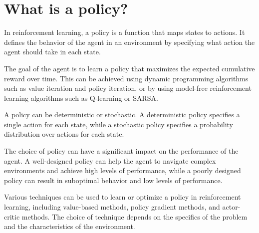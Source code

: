 \section{What is a policy?}
In reinforcement learning, a policy is a function that maps states to actions. It defines the behavior of the agent in an environment by specifying what action the agent should take in each state.

The goal of the agent is to learn a policy that maximizes the expected cumulative reward over time. This can be achieved using dynamic programming algorithms such as value iteration and policy iteration, or by using model-free reinforcement learning algorithms such as Q-learning or SARSA.

A policy can be deterministic or stochastic. A deterministic policy specifies a single action for each state, while a stochastic policy specifies a probability distribution over actions for each state.

The choice of policy can have a significant impact on the performance of the agent. A well-designed policy can help the agent to navigate complex environments and achieve high levels of performance, while a poorly designed policy can result in suboptimal behavior and low levels of performance.

Various techniques can be used to learn or optimize a policy in reinforcement learning, including value-based methods, policy gradient methods, and actor-critic methods. The choice of technique depends on the specifics of the problem and the characteristics of the environment.

